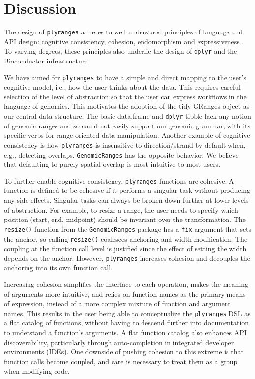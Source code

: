 \documentclass[]{article}
\begin{document}
\hypertarget{discussion}{%
\section{Discussion}\label{discussion}}

The design of \texttt{plyranges} adheres to well understood principles
of language and API design: cognitive consistency, cohesion,
endomorphism and expressiveness \cite{Green1996-qg}. To varying degrees,
these principles also underlie the design of \texttt{dplyr} and the
Bioconductor infrastructure.

We have aimed for \texttt{plyranges} to have a simple and direct mapping
to the user's cognitive model, i.e., how the user thinks about the data.
This requires careful selection of the level of abstraction so that the
user can express workflows in the language of genomics. This motivates
the adoption of the tidy GRanges object as our central data structure.
The basic data.frame and \texttt{dplyr} tibble lack any notion of
genomic ranges and so could not easily support our genomic grammar, with
its specific verbs for range-oriented data manipulation. Another example
of cognitive consistency is how \texttt{plyranges} is insensitive to
direction/strand by default when, e.g., detecting overlaps.
\texttt{GenomicRanges} has the opposite behavior. We believe that
defaulting to purely spatial overlap is most intuitive to most users.

To further enable cognitive consistency, \texttt{plyranges} functions
are cohesive. A function is defined to be cohesive if it performs a
singular task without producing any side-effects. Singular tasks can
always be broken down further at lower levels of abstraction. For
example, to resize a range, the user needs to specify which position
(start, end, midpoint) should be invariant over the transformation. The
\texttt{resize()} function from the \texttt{GenomicRanges} package has a
\texttt{fix} argument that sets the anchor, so calling \texttt{resize()}
coalesces anchoring and width modification. The coupling at the function
call level is justified since the effect of setting the width depends on
the anchor. However, \texttt{plyranges} increases cohesion and decouples
the anchoring into its own function call.

Increasing cohesion simplifies the interface to each operation, makes
the meaning of arguments more intuitive, and relies on function names as
the primary means of expression, instead of a more complex mixture of
function and argument names. This results in the user being able to
conceptualize the \texttt{plyranges} DSL as a flat catalog of functions,
without having to descend further into documentation to understand a
function's arguments. A flat function catalog also enhances API
discoverability, particularly through auto-completion in integrated
developer environments (IDEs). One downside of pushing cohesion to this
extreme is that function calls become coupled, and care is necessary to
treat them as a group when modifying code.
\end{document}

